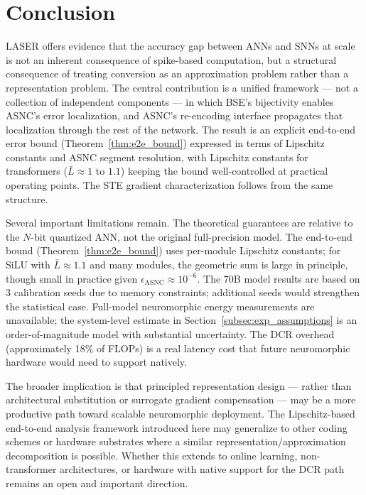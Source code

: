 \documentclass{article}
\theoremstyle{plain}
\theoremstyle{definition}
\theoremstyle{remark}
\begin{document}
\section{Conclusion}
\label{sec:conclusion}

LASER offers evidence that the accuracy gap between ANNs and SNNs at scale is
not an inherent consequence of spike-based computation, but a structural consequence
of treating conversion as an approximation problem rather than a representation
problem. The central contribution is a unified framework — not a collection of
independent components — in which BSE's bijectivity enables ASNC's error localization,
and ASNC's re-encoding interface propagates that localization through the rest of
the network. The result is an explicit end-to-end error bound
(Theorem~\ref{thm:e2e_bound}) expressed in terms of Lipschitz constants and ASNC
segment resolution, with Lipschitz constants for transformers ($\bar{L} \approx 1$ to
$1.1$) keeping the bound well-controlled at practical operating points. The STE
gradient characterization follows from the same structure.

Several important limitations remain. The theoretical guarantees are relative to the
$N$-bit quantized ANN, not the original full-precision model. The end-to-end bound
(Theorem~\ref{thm:e2e_bound}) uses per-module Lipschitz constants; for SiLU with
$\bar{L} \approx 1.1$ and many modules, the geometric sum is large in principle,
though small in practice given $\epsilon_\mathrm{ASNC} \approx 10^{-6}$. The 70B
model results are based on 3 calibration seeds due to memory constraints; additional
seeds would strengthen the statistical case. Full-model neuromorphic energy
measurements are unavailable; the system-level estimate in
Section~\ref{subsec:exp_assumptions} is an order-of-magnitude model with substantial
uncertainty. The DCR overhead (approximately 18\% of FLOPs) is a real latency cost
that future neuromorphic hardware would need to support natively.

The broader implication is that principled representation design — rather than
architectural substitution or surrogate gradient compensation — may be a more
productive path toward scalable neuromorphic deployment. The Lipschitz-based
end-to-end analysis framework introduced here may generalize to other coding schemes
or hardware substrates where a similar representation/approximation decomposition
is possible. Whether this extends to online learning, non-transformer architectures,
or hardware with native support for the DCR path remains an open and important
direction.
\end{document}

